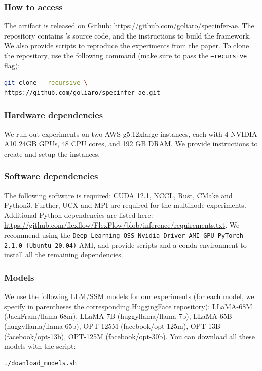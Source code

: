 \subsubsection{How to access}
The artifact is released on Github: \url{https://github.com/goliaro/specinfer-ae}. The repository contains \sys's source code, and the instructions to build the framework. We also provide scripts to reproduce the experiments from the paper. To clone the repository, use the following command (make sure to pass the \texttt{--recursive} flag):
\begin{lstlisting}[language=sh]
git clone --recursive \
https://github.com/goliaro/specinfer-ae.git
\end{lstlisting}

\subsubsection{Hardware dependencies}
We run out experiments on two AWS g5.12xlarge instances, each with 4 NVIDIA A10 24GB GPUs, 48 CPU cores, and 192 GB DRAM. We provide instructions to create and setup the instances. 

\subsubsection{Software dependencies}
The following software is required: CUDA 12.1, NCCL, Rust, CMake and Python3. Further, UCX and MPI are required for the multinode experiments. Additional Python dependencies are listed here: \url{https://github.com/flexflow/FlexFlow/blob/inference/requirements.txt}. We recommend using the \texttt{Deep Learning OSS Nvidia Driver AMI GPU PyTorch 2.1.0 (Ubuntu 20.04)} AMI, and provide scripts and a conda environment to install all the remaining dependencies.


\subsubsection{Models}
We use the following LLM/SSM models for our experiments (for each model, we specify in parentheses the corresponding HuggingFace repository): LLaMA-68M (JackFram/llama-68m), LLaMA-7B (huggyllama/llama-7b), LLaMA-65B (huggyllama/llama-65b), OPT-125M (facebook/opt-125m), OPT-13B (facebook/opt-13b), OPT-125M (facebook/opt-30b). You can download all these models with the script: 
\begin{lstlisting}[language=sh]
./download_models.sh
\end{lstlisting}

